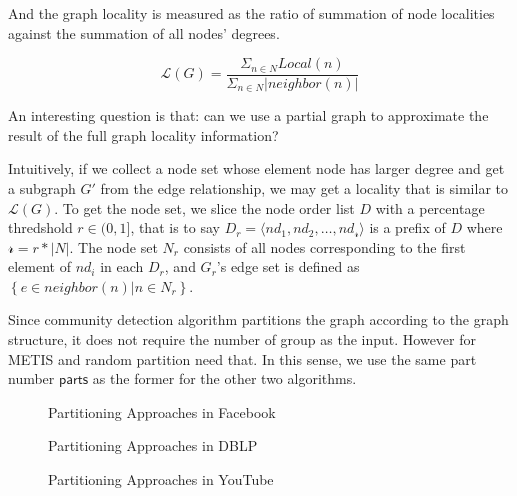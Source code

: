 And the graph locality is measured as the ratio of summation of node localities against the summation of all nodes' degrees.

\begin{equation*}\label{eq:locality}
	\mathcal{L}(G) = \frac{\Sigma _{n\in N} Local(n)}{\Sigma _{n\in N} |neighbor(n)|}
\end{equation*}

\bigskip

An interesting question is that: can we use a partial graph to approximate the result of the full graph locality information?

\bigskip

Intuitively, if we collect a node set whose element node has larger degree and get a subgraph $G'$ from the edge relationship, we may get a locality that is similar to $\mathcal{L}(G)$. To get the node set, we slice the node order list $D$ with a percentage thredshold $r\in (0,1]$, that is to say $D_r=\langle nd_1, nd_2, \ldots, nd_{\mathcal{r}}\rangle$ is a prefix of $D$ where $\mathcal{r}=r*|N|$. The node set $N_r$ consists of all nodes corresponding to the first element of $nd_i$ in each $D_r$, and $G_r$'s edge set is defined as $\left\{e\in neighbor(n)|n\in N_r\right\}$.

Since community detection algorithm partitions the graph according to the graph structure, it does not require the number of group as the input. However for METIS and random partition need that. In this sense, we use the same part number $\textsf{parts}$ as the former for the other two algorithms.


\begin{figure}[t]

  \centering
  \hfill
  \hfill
  \hfill
  \caption{Partitioning Approaches in Facebook}\label{fig:exp1_facebook}
\end{figure}

\begin{figure}[t]
  \centering
  \hfill
  \hfill
  \hfill
  \caption{Partitioning Approaches in DBLP}\label{fig:exp1_dblp}
\end{figure}

\begin{figure}[t]
  \centering
  \hfill
  \hfill
  \hfill
  \caption{Partitioning Approaches in YouTube}\label{fig:exp1_youtube}
\end{figure}

